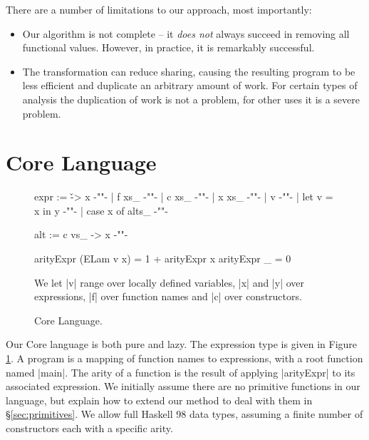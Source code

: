 \documentclass[preprint]{sigplanconf}
\begin{document}
\noindent There are a number of limitations to our approach, most importantly:

\begin{itemize}
\item Our algorithm is not complete -- it \textit{does not} always succeed in removing all functional values. However, in practice, it is remarkably successful.
\item The transformation can reduce sharing, causing the resulting program to be less efficient and duplicate an arbitrary amount of work. For certain types of analysis the duplication of work is not a problem, for other uses it is a severe problem.
\end{itemize}

\section{Core Language}
\label{sec:core}

\begin{figure}
\ignore\begin{code}
expr  :=  \v -> x           {-""-}
      |   f xs_             {-""-}
      |   c xs_             {-""-}
      |   x xs_             {-""-}
      |   v                 {-""-}
      |   let v = x in y    {-""-}
      |   case x of alts_   {-""-}

alt   :=  c vs_ -> x         {-""-}
\end{code}
\begin{code}
arityExpr (ELam v x)  = 1 + arityExpr x
arityExpr _           = 0
\end{code}

We let |v| range over locally defined variables, |x| and |y| over expressions, |f| over function names and |c| over constructors.
\caption{Core Language.}
\label{fig:core}
\end{figure}

Our Core language is both pure and lazy. The expression type is given in Figure \ref{fig:core}. A program is a mapping of function names to expressions, with a root function named |main|. The arity of a function is the result of applying |arityExpr| to its associated expression. We initially assume there are no primitive functions in our language, but explain how to extend our method to deal with them in \S\ref{sec:primitives}. We allow full Haskell 98 data types, assuming a finite number of constructors each with a specific arity.
\end{document}
